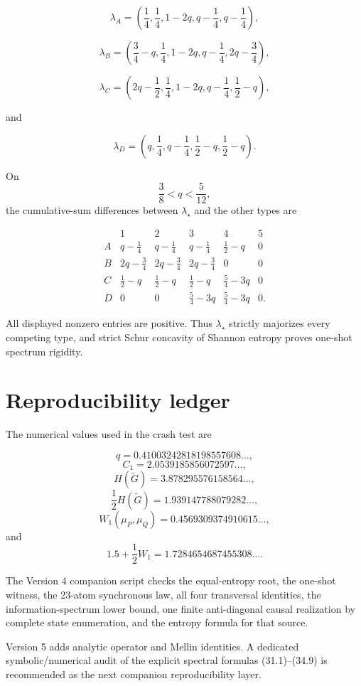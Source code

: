 \documentclass[11pt,a4paper]{article}
\newcommand{\1}{\mathbf 1}
\begin{document}
\[
\lambda_A
=
\left(
\frac14,\frac14,1-2q,q-\frac14,q-\frac14
\right),
\]

\[
\lambda_B
=
\left(
\frac34-q,\frac14,1-2q,q-\frac14,2q-\frac34
\right),
\]

\[
\lambda_C
=
\left(
2q-\frac12,\frac14,1-2q,q-\frac14,\frac12-q
\right),
\]

and

\[
\lambda_D
=
\left(
q,\frac14,q-\frac14,\frac12-q,\frac12-q
\right).
\]

On
\[
\frac38<q<\frac5{12},
\]
the cumulative-sum differences between \(\lambda_\star\) and the other
types are

\[
\begin{array}{c|ccccc}
&
1&2&3&4&5
\\
\hline
A&
q-\frac14&
q-\frac14&
q-\frac14&
\frac12-q&
0
\\[1mm]
B&
2q-\frac34&
2q-\frac34&
2q-\frac34&
0&
0
\\[1mm]
C&
\frac12-q&
\frac12-q&
\frac12-q&
\frac54-3q&
0
\\[1mm]
D&
0&
0&
\frac54-3q&
\frac54-3q&
0 .
\end{array}
\tag{B.1}
\]

All displayed nonzero entries are positive.
Thus \(\lambda_\star\) strictly majorizes every competing type, and
strict Schur concavity of Shannon entropy proves one-shot spectrum
rigidity.


\section{Reproducibility ledger}

The numerical values used in the crash test are

\[
q
=
0.41003242818198557608\ldots,
\]
\[
C_1
=
2.0539185856072597\ldots,
\]
\[
H(\widetilde G)
=
3.878295576158564\ldots,
\]
\[
\frac12H(\widetilde G)
=
1.939147788079282\ldots,
\]
\[
W_1(\mu_P,\mu_Q)
=
0.4569309374910615\ldots,
\]
and
\[
1.5+\frac12W_1
=
1.7284654687455308\ldots.
\]

The Version 4 companion script checks the equal-entropy root, the
one-shot witness, the 23-atom synchronous law, all four transversal
identities, the information-spectrum lower bound, one finite
anti-diagonal causal realization by complete state enumeration, and the
entropy formula for that source.

Version 5 adds analytic operator and Mellin identities.
A dedicated symbolic/numerical audit of the explicit spectral formulas
(31.1)--(34.9) is recommended as the next companion
reproducibility layer.
\end{document}
